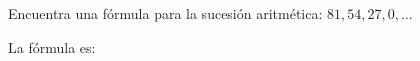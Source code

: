 Encuentra una fórmula para la sucesión aritmética: $81,54,27,0,\dots$

La f\'ormula es: \fillin[$81-27(n-1) \text{ \'o } 108-27n$][5cm]
